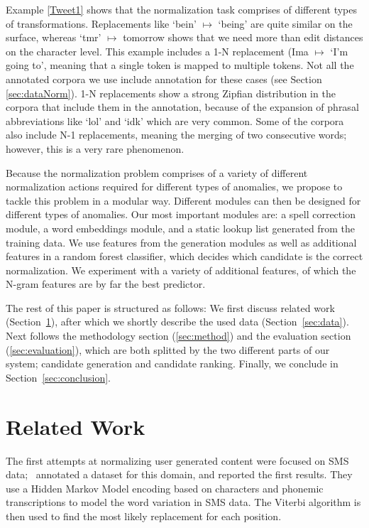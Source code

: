 \documentclass[a4paper,10pt,twoside]{article}
\begin{document}
Example \ref{Tweet1} shows that the normalization task comprises of
different types of transformations. Replacements like `bein' $\mapsto$ `being' 
are quite similar on the surface, whereas `tmr' $\mapsto$ tomorrow shows that
we need more than edit distances on the character level. This example 
includes a 1-N replacement (Ima $\mapsto$ `I'm going to', meaning that a single
token is mapped to multiple tokens. Not all the annotated corpora we use
include annotation for these cases (see Section \ref{sec:dataNorm}).
1-N replacements show a strong Zipfian distribution in the corpora that include
them in the annotation, because of the expansion of phrasal abbreviations like
`lol' and `idk' which are very common. Some of the corpora also include N-1
replacements, meaning the merging of two consecutive words; however, this is a
very rare phenomenon.

Because the normalization problem comprises of a variety of different
normalization actions required for different types of anomalies, we propose
to tackle this problem in a modular way.  Different modules can then be
designed for different types of anomalies.  Our most important modules are:
a spell correction module, a word embeddings module, and a static lookup list
generated from the training data.  We use features from the generation modules
as well as additional features in a random forest classifier, which decides
which candidate is the correct normalization. We experiment with a variety of
additional features, of which the N-gram features are by far the best
predictor.

The rest of this paper is structured as follows: We first discuss related work
(Section~\ref{sec:related}), after which we shortly describe the used data
(Section~\ref{sec:data}).  Next follows the methodology section
(\ref{sec:method}) and the evaluation section (\ref{sec:evaluation}), which are
both splitted by the two different parts of our system; candidate generation
and candidate ranking.  Finally, we conclude in Section~\ref{sec:conclusion}.

 
\section{Related Work}
\label{sec:related}
The first attempts at normalizing user generated content were focused on SMS
data;~ annotated a dataset for this
domain, and reported the first results. They use a Hidden Markov Model
encoding based on characters and phonemic transcriptions to model the word
variation in SMS data.  The Viterbi algorithm is then used to find the most
likely replacement for each position.
\end{document}
